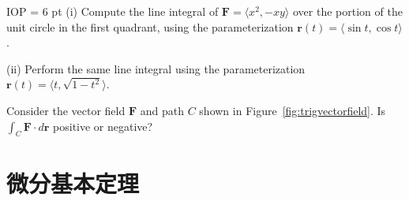 \documentclass[indent]{watsonbook}
\begin{document}
\begin{exercise}{}{IOP} \parskip = 6 pt
  (i) Compute the line integral of
  $\mathbf{F} = \langle x^2,-xy\rangle$ over the portion of the unit
  circle in the first quadrant, using the parameterization
  $\mathbf{r}(t) = \langle \sin t, \cos t \rangle$.

  (ii) Perform the same line integral using the parameterization
  $\mathbf{r}(t) = \langle t, \sqrt{1-t^2} \rangle$.
\end{exercise}

\begin{exercise}{}{}
  Consider the vector field $\mathbf{F}$ and path $C$ shown in
  Figure~\ref{fig:trigvectorfield}. Is
  $\int_C \mathbf{F} \cdot {d}\mathbf{r}$ positive or negative?
\end{exercise}

\section{微分基本定理} \label{sec:line_integrals}

\end{document}
